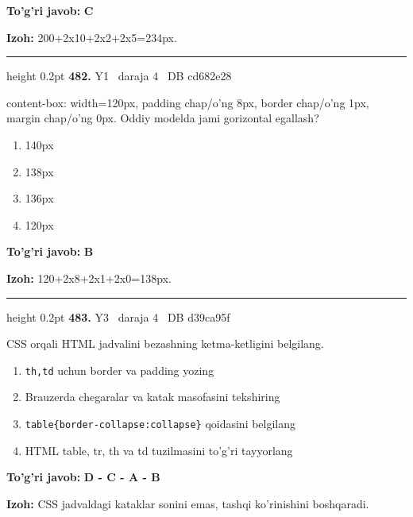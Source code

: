 \documentclass[10pt,a4paper,oneside]{article}
\begin{document}
\begin{tcolorbox}[enhanced,breakable,colback=teal!4,colframe=teal!45!black,boxrule=0.45pt,arc=1.2mm,left=2.8mm,right=2.8mm,top=2mm,bottom=2mm,before skip=2mm,after skip=2mm]
\textbf{\color{teal}To'g'ri javob:} \textbf{C}
\par\smallskip
\textbf{Izoh:} 200+2x10+2x2+2x5=234px.
\end{tcolorbox}
\vspace{2mm}\hrule height 0.2pt \vspace{4mm}
\hypertarget{q482}{\textbf{\color{ink}482.}}  {\color{muted}\scriptsize Y1 \textbullet\ daraja 4 \textbullet\ DB cd682e28}
\par
content-box: width=120px, padding chap/o'ng 8px, border chap/o'ng 1px, margin chap/o'ng 0px. Oddiy modelda jami gorizontal egallash?
\begin{enumerate}[label=\Alph*),leftmargin=9mm]
\item 140px
\item 138px
\item 136px
\item 120px
\end{enumerate}
\begin{tcolorbox}[enhanced,breakable,colback=teal!4,colframe=teal!45!black,boxrule=0.45pt,arc=1.2mm,left=2.8mm,right=2.8mm,top=2mm,bottom=2mm,before skip=2mm,after skip=2mm]
\textbf{\color{teal}To'g'ri javob:} \textbf{B}
\par\smallskip
\textbf{Izoh:} 120+2x8+2x1+2x0=138px.
\end{tcolorbox}
\vspace{2mm}\hrule height 0.2pt \vspace{4mm}
\hypertarget{q483}{\textbf{\color{ink}483.}}  {\color{muted}\scriptsize Y3 \textbullet\ daraja 4 \textbullet\ DB d39ca95f}
\par
CSS orqali HTML jadvalini bezashning ketma-ketligini belgilang.
\begin{enumerate}[label=\Alph*),leftmargin=9mm]
\item \texttt{th,td} uchun border va padding yozing
\item Brauzerda chegaralar va katak masofasini tekshiring
\item \texttt{table\{border-collapse:collapse\}} qoidasini belgilang
\item HTML table, tr, th va td tuzilmasini to'g'ri tayyorlang
\end{enumerate}
\begin{tcolorbox}[enhanced,breakable,colback=teal!4,colframe=teal!45!black,boxrule=0.45pt,arc=1.2mm,left=2.8mm,right=2.8mm,top=2mm,bottom=2mm,before skip=2mm,after skip=2mm]
\textbf{\color{teal}To'g'ri javob:} \textbf{D - C - A - B}
\par\smallskip
\textbf{Izoh:} CSS jadvaldagi kataklar sonini emas, tashqi ko'rinishini boshqaradi.
\end{tcolorbox}
\end{document}
